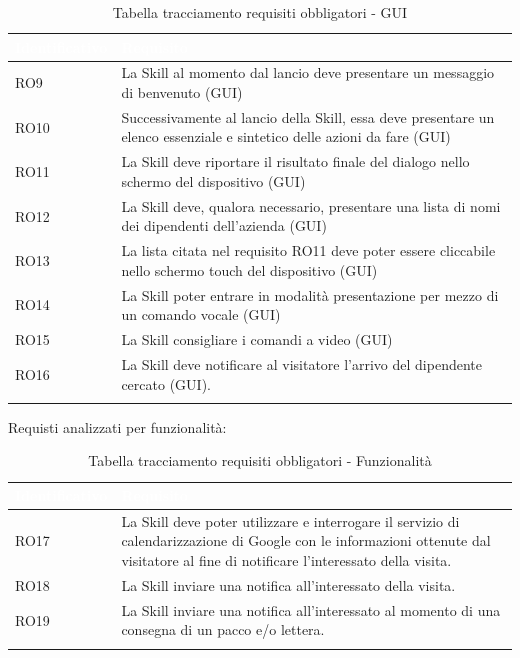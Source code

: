 \begin{center}
	\centering
	\renewcommand{\arraystretch}{1.5}
	\begin{longtable}{  p{2.5cm} p{9.8cm} }
		\rowcolor{tableHead}
		\textbf{\textcolor{white}{Identificativo}} & \textbf{\textcolor{white}{Requisito}} \\
		\endhead  
		RO9 & La Skill al momento dal lancio deve presentare un messaggio di benvenuto (GUI) \\
		RO10 & Successivamente al lancio della Skill, essa deve presentare un elenco essenziale e sintetico delle azioni da fare  (GUI) \\
		RO11 & La Skill deve riportare il risultato finale del dialogo nello schermo del dispositivo (GUI) \\
	    RO12 & La Skill deve, qualora necessario, presentare una lista di nomi dei dipendenti dell'azienda (GUI) \\
	    RO13 & La lista citata nel requisito RO11 deve poter essere cliccabile nello schermo touch del dispositivo (GUI) \\
	    RO14 & La Skill poter entrare in modalità presentazione per mezzo di un comando vocale (GUI) \\
	    RO15 & La Skill consigliare i comandi a video (GUI) \\
	    RO16 & La Skill deve notificare al visitatore l'arrivo del dipendente cercato (GUI).\\
		\rowcolor{white}
		\caption{Tabella tracciamento requisiti obbligatori - GUI}
	\end{longtable}
\end{center}
Requisti analizzati per funzionalità:
\begin{center}
	\centering
	\renewcommand{\arraystretch}{1.5}
	\begin{longtable}{  p{2.5cm} p{9.8cm} }
		\rowcolor{tableHead}
		\textbf{\textcolor{white}{Identificativo}} & \textbf{\textcolor{white}{Requisito}} \\
		\endhead  
		RO17 & La Skill deve poter utilizzare e interrogare il servizio di calendarizzazione di Google con le informazioni ottenute dal visitatore al fine di notificare l'interessato della visita.\\
		RO18 & La Skill inviare una notifica all'interessato della visita.\\
		RO19 & La Skill inviare una notifica all'interessato al momento di una consegna di un pacco e/o lettera.\\
		\rowcolor{white}
		\caption{Tabella tracciamento requisiti obbligatori - Funzionalità}
	\end{longtable}
\end{center}

